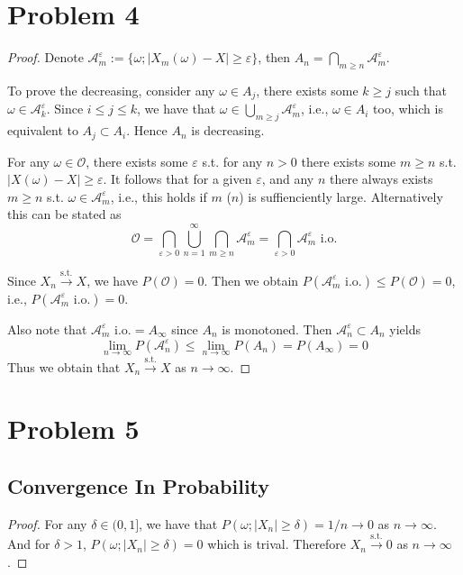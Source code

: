 \documentclass{homework}
\begin{document}
    \section{Problem 4}
    \begin{proof}
        Denote $\mathcal A_m^\varepsilon:=\{\omega;|X_m(\omega)-X|\geq\varepsilon\}$,
        then $A_n=\bigcap_{m\geq n}\mathcal A_m^\varepsilon$.

        To prove the decreasing, consider any $\omega\in A_j$,
        there exists some $k\geq j$ such that $\omega\in\mathcal A_k^\varepsilon$.
        Since $i\leq j\leq k$, we have that $\omega\in\bigcup_{m\geq j}\mathcal A_m^\varepsilon$,
        i.e., $\omega\in A_i$ too, which is equivalent to $A_j\subset A_i$. Hence
        $A_n$ is decreasing.

        For any $\omega\in\mathcal O$, there exists some $\varepsilon$ s.t.
        for any $n>0$ there exists some $m\geq n$ s.t. $|X(\omega)-X|\geq\varepsilon$.
        It follows that for a given $\varepsilon$, and any $n$ there always
        exists $m\geq n$ s.t. $\omega\in\mathcal A_m^\varepsilon$, i.e.,
        this holds if $m$ ($n$) is suffienciently large.
        Alternatively this can be stated as
        \[\mathcal O=\bigcap_{\varepsilon>0}\bigcup_{n=1}^\infty
        \bigcap_{m\geq n}\mathcal A_m^\varepsilon
        =\bigcap_{\varepsilon>0}\mathcal A_m^\varepsilon\text{ i.o.}\]

        Since $X_n\xrightarrow{\mathrm{s.t.}}X$, we have $P(\mathcal O)=0$.
        Then we obtain $P(\mathcal A_m^\varepsilon\text{ i.o.})\leq
        P(\mathcal{O})=0$, i.e., $P(\mathcal A_m^\varepsilon\text{ i.o.})=0$.
        
        Also note that $\mathcal A_m^\varepsilon\text{ i.o.}=A_\infty$ since
        $A_n$ is monotoned. Then $\mathcal A_n^\varepsilon
        \subset A_n$ yields
        \[\lim_{n\to\infty}P(\mathcal A_n^\varepsilon)
        \leq\lim_{n\to\infty}P(A_n)=P(A_\infty)=0\]
        Thus we obtain that $X_n\xrightarrow{\mathrm{s.t.}}X$ as
        $n\to\infty$.
    \end{proof}

    \section{Problem 5}
    \subsection{Convergence In Probability}
    \begin{proof}
        For any $\delta\in(0,1]$, we have that $P(\omega;|X_n|\geq\delta)
        =1/n\to 0$ as $n\to\infty$. And for $\delta>1$, $P(\omega;|X_n|\geq\delta)
        =0$ which is trival. Therefore $X_n\xrightarrow{\mathrm{s.t.}}0$ as
        $n\to\infty$.
    \end{proof}
\end{document}
